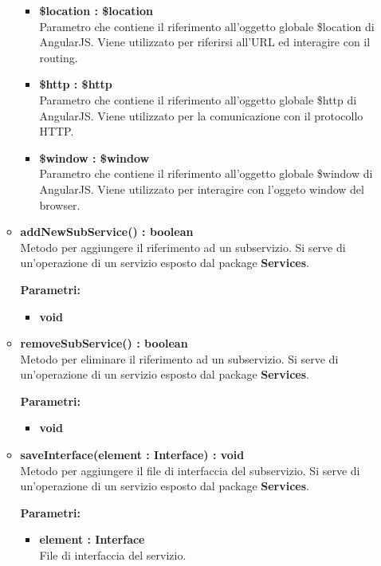 \begin{itemize}
\begin{itemize}
\begin{itemize}
			\item \textbf{\$location : \$location}\\
			Parametro che contiene il riferimento all'oggetto globale \$location di AngularJS. Viene utilizzato per riferirsi all'URL ed interagire con il routing.
			
			\item \textbf{\$http : \$http}\\
			Parametro che contiene il riferimento all'oggetto globale \$http di AngularJS. Viene utilizzato per la comunicazione con il protocollo HTTP.
			
			\item \textbf{\$window : \$window}\\
			Parametro che contiene il riferimento all'oggetto globale \$window di AngularJS. Viene utilizzato per interagire con l'oggeto window del browser.
		\end{itemize}
		
		\item \textbf{addNewSubService() : boolean}\\
		Metodo per aggiungere il riferimento ad un subservizio. Si serve di un'operazione di un servizio esposto dal package \textbf{Services}.
		\begin{description}
			\item[\textbf{Parametri:}]
		\end{description}
		\begin{itemize}
			\item \textbf{void}\\
		\end{itemize}
		
		\item \textbf{removeSubService() : boolean}\\
		Metodo per eliminare il riferimento ad un subservizio. Si serve di un'operazione di un servizio esposto dal package \textbf{Services}.
		\begin{description}
			\item[\textbf{Parametri:}]
		\end{description}
		\begin{itemize}
			\item \textbf{void}\\
		\end{itemize}
		
		\item \textbf{saveInterface(element : Interface) : void}\\
		Metodo per aggiungere il file di interfaccia del subservizio. Si serve di un'operazione di un servizio esposto dal package \textbf{Services}.
		\begin{description}
			\item[\textbf{Parametri:}]
		\end{description}
		\begin{itemize}
			\item \textbf{element : Interface}\\
			File di interfaccia del servizio.
		\end{itemize}
		

\end{itemize}
\end{itemize}

